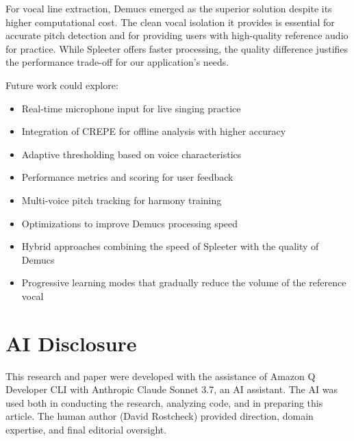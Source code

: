 \documentclass[conference]{IEEEtran}
\begin{document}
For vocal line extraction, Demucs emerged as the superior solution despite its higher computational cost. The clean vocal isolation it provides is essential for accurate pitch detection and for providing users with high-quality reference audio for practice. While Spleeter offers faster processing, the quality difference justifies the performance trade-off for our application's needs.

Future work could explore:
\begin{itemize}
    \item Real-time microphone input for live singing practice
    \item Integration of CREPE for offline analysis with higher accuracy
    \item Adaptive thresholding based on voice characteristics
    \item Performance metrics and scoring for user feedback
    \item Multi-voice pitch tracking for harmony training
    \item Optimizations to improve Demucs processing speed
    \item Hybrid approaches combining the speed of Spleeter with the quality of Demucs
    \item Progressive learning modes that gradually reduce the volume of the reference vocal
\end{itemize}

\section*{AI Disclosure}
This research and paper were developed with the assistance of Amazon Q Developer CLI with Anthropic Claude Sonnet 3.7, an AI assistant. The AI was used both in conducting the research, analyzing code, and in preparing this article. The human author (David Rostcheck) provided direction, domain expertise, and final editorial oversight.
\end{document}
